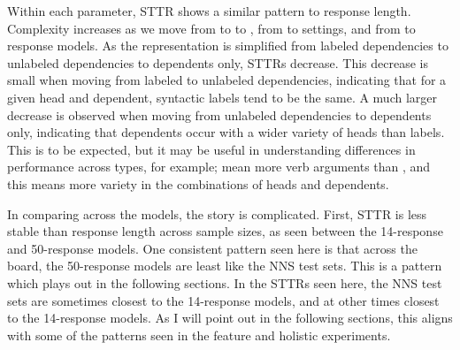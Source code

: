 Within each parameter, STTR shows a similar pattern to response length. Complexity increases as we move from  to  to , from  to  settings, and from  to  response models. As the representation is simplified from labeled dependencies to unlabeled dependencies to dependents only, STTRs decrease. This decrease is small when moving from labeled to unlabeled dependencies, indicating that for a given head and dependent, syntactic labels tend to be the same. A much larger decrease is observed when moving from unlabeled dependencies to dependents only, indicating that dependents occur with a wider variety of heads than labels. This is to be expected, but it may be useful in understanding differences in performance across  types, for example;  mean more verb arguments than , and this means more variety in the combinations of heads and dependents.

In comparing across the models, the story is complicated. First, STTR is less stable than response length across sample sizes, as seen between the 14-response and 50-response  models. One consistent pattern seen here is that across the board, the 50-response  models are least like the NNS test sets. This is a pattern which plays out in the following sections. In the STTRs seen here, the NNS test sets are sometimes closest to the 14-response  models, and at other times closest to the 14-response  models. As I will point out in the following sections, this aligns with some of the patterns seen in the feature and holistic experiments.

